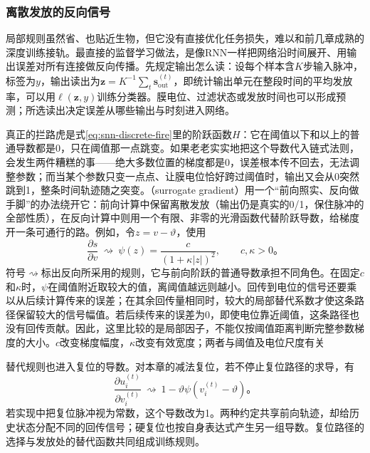 \subsubsection{离散发放的反向信号}
\label{sec:snn-surrogate-signal}

局部规则虽然省、也贴近生物，但它没有直接优化任务损失，难以和前几章成熟的深度训练接轨。最直接的监督学习做法，是像RNN一样把网络沿时间展开、用输出误差对所有连接做反向传播。先规定输出怎么读：设每个样本含$K$步输入脉冲，标签为$y$，输出读出为$\bm z=K^{-1}\sum_t\bm s_{\mathrm{out}}^{(t)}$，即统计输出单元在整段时间的平均发放率，可以用$\ell(\bm z,y)$训练分类器。膜电位、过滤状态或发放时间也可以形成预测；所选读出决定误差从哪些输出与时刻进入网络。

真正的拦路虎是式\eqref{eq:snn-discrete-fire}里的阶跃函数$H$：它在阈值以下和以上的普通导数都是0，只在阈值那一点跳变。如果老老实实地把这个导数代入链式法则，会发生两件糟糕的事——绝大多数位置的梯度都是0，误差根本传不回去，无法调整参数；而当某个参数只变一点点、让膜电位恰好跨过阈值时，输出又会从0突然跳到1，整条时间轨迹随之突变。（surrogate gradient）用一个“前向照实、反向做手脚”的办法绕开它：前向计算中保留离散发放（输出仍是真实的0/1，保住脉冲的全部性质），在反向计算中则用一个有限、非零的光滑函数代替阶跃导数，给梯度开一条可通行的路。例如，令$z=v-\vartheta$，使用
\begin{equation}
  \frac{\partial s}{\partial v}\ \rightsquigarrow\
  \psi(z)=\frac{c}{(1+\kappa|z|)^2},\qquad c,\kappa>0\text{。}
  \label{eq:snn-surrogate-derivative}
\end{equation}
符号$\rightsquigarrow$标出反向所采用的规则，它与前向阶跃的普通导数承担不同角色。在固定$c$和$\kappa$时，$\psi$在阈值附近取较大的值，离阈值越远则越小。回传到电位的信号还要乘以从后续计算传来的误差；在其余回传量相同时，较大的局部替代系数才使这条路径保留较大的信号幅值。若后续传来的误差为0，即使电位靠近阈值，这条路径也没有回传贡献。因此，这里比较的是局部因子，不能仅按阈值距离判断完整参数梯度的大小。$c$改变梯度幅度，$\kappa$改变有效宽度；两者与阈值及电位尺度有关

替代规则也进入复位的导数。对本章的减法复位，若不停止复位路径的求导，有
\begin{equation}
  \frac{\partial u_i^{(t)}}{\partial v_i^{(t)}}
  \ \rightsquigarrow\ 1-\vartheta\psi(v_i^{(t)}-\vartheta)\text{。}
  \label{eq:snn-reset-gradient}
\end{equation}
若实现中把复位脉冲视为常数，这个导数改为1。两种约定共享前向轨迹，却给历史状态分配不同的回传信号；硬复位也按自身表达式产生另一组导数。复位路径的选择与发放处的替代函数共同组成训练规则。

